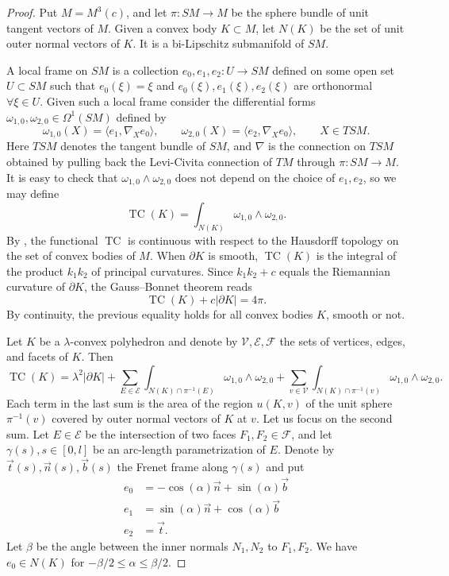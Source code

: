 \documentclass[12pt]{amsart}
\DeclareMathOperator{\TC}{\mathrm{TC}}
\renewcommand{\le}{\leqslant}
\theoremstyle{theorem}
\theoremstyle{Intro}
\theoremstyle{definition}
\theoremstyle{remark}
\theoremstyle{claim}
\numberwithin{equation}{section}
\begin{document}
\begin{proof}
Put $M=M^3(c)$, and let $\pi\colon SM\to M$ be the sphere bundle of unit tangent vectors of $M$. Given a convex body $K\subset M$, let $N(K)$ be the set of unit outer normal vectors of $K$. It is a bi-Lipschitz submanifold of $SM$. 

A local frame on $SM$ is a collection $e_0,e_1,e_2\colon U\to SM$ defined on some open set $U\subset SM$ such that $e_0(\xi)=\xi$ and $e_0(\xi),e_1(\xi),e_2(\xi)$ are orthonormal $\forall\xi\in U$.
Given such a local frame consider the differential forms $\omega_{1,0},\omega_{2,0}\in \Omega^1(SM)$ defined by 
\[
\omega_{1,0}(X)=\langle e_1,\nabla_X e_0\rangle,\qquad \omega_{2,0}(X)=\langle e_2,\nabla_X e_0\rangle,\qquad X\in T SM.
\]
Here $TSM$ denotes the tangent bundle of $SM$, and $\nabla$ is the connection on $TSM$ obtained by pulling back the Levi-Civita connection of $TM$ through $\pi\colon SM\to M$. 
It is easy to check that $\omega_{1,0}\wedge\omega_{2,0}$ does not depend on the choice of $e_1,e_2$, so we may define
\[
\TC(K)=\int_{N(K)} \omega_{1,0}\wedge\omega_{2,0}.
\]
By \cite[Theorem 2.1.13]{AleskerFu}, the functional $\TC$ is continuous with respect to the Hausdorff topology on the set of convex bodies of $M$. When $\partial K$ is smooth, $\TC(K)$ is the integral of the product $k_1k_2$ of principal curvatures. Since $k_1k_2+c$ equals the Riemannian curvature of $\partial K$, the Gauss--Bonnet theorem reads
\begin{equation}
\label{Eq:First}
\TC(K)+c|\partial K|=4\pi.
\end{equation}
By continuity, the previous equality holds for all convex bodies $K$, smooth or not. 


Let $K$ be a $\lambda$-convex polyhedron and denote by $\mathcal V,\mathcal E,\mathcal F$ the sets of vertices, edges, and facets of $K$. Then
\[
\TC(K)=\lambda^2|\partial K| +\sum_{E\in\mathcal E} \int_{N(K)\cap \pi^{-1}(E)}\omega_{1,0}\wedge\omega_{2,0} + \sum_{v\in\mathcal V} \int_{N(K)\cap \pi^{-1}(v)}\omega_{1,0}\wedge\omega_{2,0}.
 \]
Each term in the last sum is the area of the region $u(K,v)$ of the unit sphere $\pi^{-1}(v)$ covered by outer normal vectors of $K$ at $v$. Let us focus on the second sum. Let $E\in\mathcal E$ be the intersection of two faces $F_1,F_2\in\mathcal F$, and let $\gamma(s), s\in[0,l]$ be an arc-length parametrization of $E$. Denote by $\vec t(s),\vec n(s),\vec b(s)$ the Frenet frame along $\gamma(s)$ and put
\begin{align*}
 e_0&=-\cos(\alpha)\vec{n}+\sin(\alpha)\vec b\\
 e_1&=\sin(\alpha)\vec n+\cos(\alpha)\vec b\\
 e_2&=\vec t.
\end{align*}
Let $\beta$ be the angle between the inner normals $N_1,N_2$ to $F_1,F_2$. We have $e_0\in N(K)$ for $-\beta/2\le  \alpha \le \beta/2$.


\end{proof}
\end{document}
